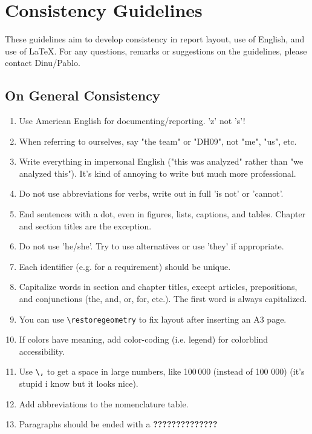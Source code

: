 \chapter*{Consistency Guidelines}
\label{chapter:template-guidelines}
These guidelines aim to develop consistency in report layout, use of English, and use of \LaTeX. For any questions, remarks or suggestions on the guidelines, please contact Dinu/Pablo.

\section*{On General Consistency}
\label{sec:general-consistency}
\begin{enumerate}[label=G.\arabic*]
    \item Use American English for documenting/reporting. 'z' not 's'!
    \item When referring to ourselves, say "the team" or "DH09", not "me", "us", etc.
    \item Write everything in impersonal English ("this was analyzed" rather than "we analyzed this"). It's kind of annoying to write but much more professional.
    \item Do not use abbreviations for verbs, write out in full 'is not' or 'cannot'.
    \item End sentences with a dot, even in figures, lists, captions, and tables. Chapter and section titles are the exception.
    \item Do not use 'he/she'. Try to use alternatives or use 'they' if appropriate.
    \item Each identifier (e.g. for a requirement) should be unique. %
    \item Capitalize words in section and chapter titles, except articles, prepositions, and conjunctions (the, and, or, for, etc.). The first word is always capitalized.
    \item You can use \verb|\restoregeometry| to fix layout after inserting an A3 page.
    \item If colors have meaning, add color-coding (i.e. legend) for colorblind accessibility.
    \item Use \verb|\,| to get a space in large numbers, like 100\,000 (instead of 100 000) (it's stupid i know but it looks nice).
    \item Add abbreviations to the nomenclature table. 
    \item Paragraphs should be ended with a \textbf{??????????????} 
\end{enumerate}
